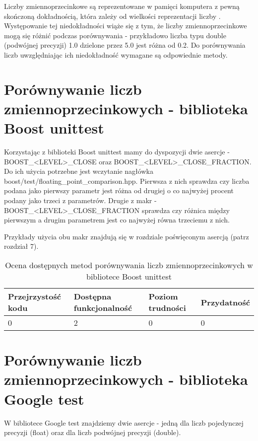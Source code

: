 \documentclass[12pt,a4paper,notitlepage]{report}
\begin{document}
Liczby zmiennoprzecinkowe są reprezentowane w pamięci komputera z pewną skończoną dokładnością, która zależy od wielkości reprezentacji liczby \cite{IEEE754}. Występowanie tej niedokładności wiąże się z tym, że liczby zmiennoprzecinkowe mogą się różnić podczas porównywania - przykładowo liczba typu double (podwójnej precyzji) 1.0 dzielone przez 5.0 jest różna od 0.2.
Do porównywania liczb uwzględniając ich niedokładność wymagane są odpowiednie metody.

\section{Porównywanie liczb zmiennoprzecinkowych - biblioteka Boost unittest}

Korzystając z biblioteki Boost unittest mamy do dyspozycji dwie asercje - BOOST{\_}<LEVEL>{\_}CLOSE oraz BOOST{\_}<LEVEL>{\_}CLOSE{\_}FRACTION. Do ich użycia potrzebne jest wczytanie nagłówka boost/test/floating{\_}point{\_}comparison.hpp.
Pierwsza z nich sprawdza czy liczba podana jako pierwszy parametr jest różna od drugiej o co najwyżej procent podany jako trzeci z parametrów.
Drugie z makr - BOOST{\_}<LEVEL>{\_}CLOSE{\_}FRACTION sprawdza czy różnica między pierwszym a drugim parametrem jest co najwyżej równa trzeciemu z nich.

Przykłady użycia obu makr znajdują się w rozdziale poświęconym asercją (patrz rozdział 7).

\begin{center}
			\begin{table}[!ht]
			\caption{Ocena dostępnych metod porównywania liczb zmiennoprzecinkowych w bibliotece Boost unittest}
			\label{}
			\begin{tabular}[!hc]{|l|l|l|l|}
		\hline
		Przejrzystość kodu 	&	Dostępna funkcjonalność	&	Poziom trudności	&	Przydatność \\ \hline
		0					&	2						&	0					& 	0  			\\ \hline
			\end{tabular}
			\end{table} 
		\end{center}

\section{Porównywanie liczb zmiennoprzecinkowych - biblioteka Google test}

W bibliotece Google test znajdziemy dwie asercje - jedną dla liczb pojedynczej precyzji (float) oraz dla liczb podwójnej precyzji (double).
\end{document}
